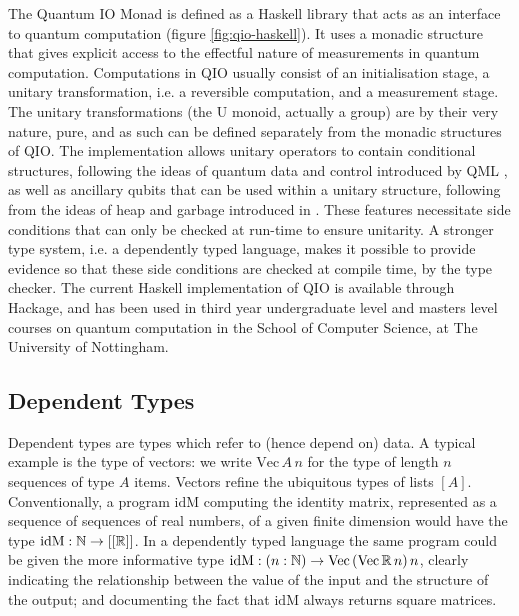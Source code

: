 \documentclass[a4paper]{article}
\begin{document}
The Quantum IO Monad  is defined as a
Haskell library that acts as an interface to quantum computation
(figure \ref{fig:qio-haskell}). It uses a monadic structure that gives
explicit access to the effectful nature of measurements in quantum
computation.  Computations in QIO usually consist of an initialisation
stage, a unitary transformation, i.e. a reversible computation, and a
measurement stage. The unitary transformations (the U monoid, actually
a group) are by their very nature, pure, and as such can be defined
separately from the monadic structures of QIO. The implementation
allows unitary operators to contain conditional structures, following
the ideas of quantum data and control introduced by QML
, as well as ancillary qubits that can be used
within a unitary structure, following from the ideas of heap and
garbage introduced in . These features
necessitate side conditions that can only be checked at run-time to
ensure unitarity.
A stronger type system, i.e. a dependently typed language, makes it
possible to provide evidence so that these side conditions are
checked at compile time, by the type checker. The current Haskell
implementation of QIO is available through Hackage,
and has been used in third year undergraduate level and masters level
courses on quantum computation in the School of Computer Science, at
The University of Nottingham.

\subsection*{Dependent Types}
Dependent types are types which refer to (hence depend on)
data. A typical example is the type of vectors: we write
$\mathrm{Vec}\,A\,n$ for the type of length $n$ sequences of type $A$
items. Vectors refine the ubiquitous types of lists $[A]$.
Conventionally, a program $\mathrm{idM}$ computing the identity
matrix, represented as a sequence of sequences of real numbers, of a
given finite dimension would have the type $\mathrm{idM} : \Bbb{N} \to
[[\Bbb{R}]]$. In a dependently typed language the same program could
be given the more informative type $\mathrm{idM} : (n:\Bbb{N}) \to
\mathrm{Vec}\,(\mathrm{Vec}\,\Bbb{R}\,n)\,n$, clearly indicating the
relationship between the value of the input and the structure of the
output; and documenting the fact that $\mathrm{idM}$ always returns
square matrices.
\end{document}
